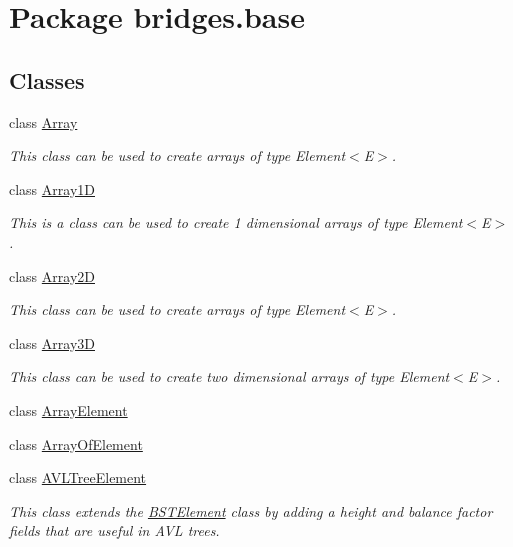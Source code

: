 \hypertarget{namespacebridges_1_1base}{}\section{Package bridges.\+base}
\label{namespacebridges_1_1base}
\subsection*{Classes}
\begin{DoxyCompactItemize}
\item 
class \hyperlink{classbridges_1_1base_1_1_array}{Array}
\begin{DoxyCompactList}\small\item\em This class can be used to create arrays of type Element$<$\+E$>$. \end{DoxyCompactList}\item 
class \hyperlink{classbridges_1_1base_1_1_array1_d}{Array1D}
\begin{DoxyCompactList}\small\item\em This is a class can be used to create 1 dimensional arrays of type Element$<$\+E$>$. \end{DoxyCompactList}\item 
class \hyperlink{classbridges_1_1base_1_1_array2_d}{Array2D}
\begin{DoxyCompactList}\small\item\em This class can be used to create arrays of type Element$<$\+E$>$. \end{DoxyCompactList}\item 
class \hyperlink{classbridges_1_1base_1_1_array3_d}{Array3D}
\begin{DoxyCompactList}\small\item\em This class can be used to create two dimensional arrays of type Element$<$\+E$>$. \end{DoxyCompactList}\item 
class \hyperlink{classbridges_1_1base_1_1_array_element}{Array\+Element}
\item 
class \hyperlink{classbridges_1_1base_1_1_array_of_element}{Array\+Of\+Element}
\item 
class \hyperlink{classbridges_1_1base_1_1_a_v_l_tree_element}{A\+V\+L\+Tree\+Element}
\begin{DoxyCompactList}\small\item\em This class extends the \hyperlink{classbridges_1_1base_1_1_b_s_t_element}{B\+S\+T\+Element} class by adding a height and balance factor fields that are useful in A\+VL trees. \end{DoxyCompactList}\item 

\end{DoxyCompactItemize}

